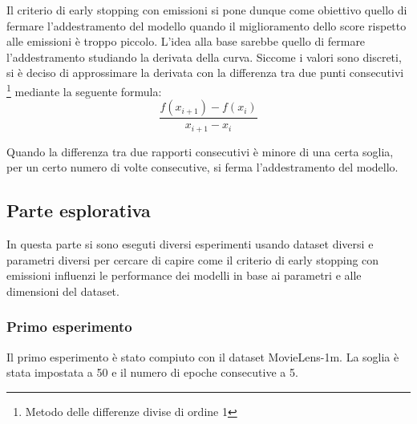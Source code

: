 \noindent Il criterio di early stopping con emissioni si pone dunque come obiettivo quello di fermare l'addestramento del modello quando il miglioramento dello score rispetto alle emissioni è troppo piccolo.
L'idea alla base sarebbe quello di fermare l'addestramento studiando la derivata della curva. Siccome i valori sono discreti, si è deciso di approssimare la derivata con la differenza tra due punti consecutivi \footnote{Metodo delle differenze divise di ordine 1}{} mediante la seguente formula:
\begin{equation}
    \frac{f(x_{i+1}) - f(x_i)}{x_{i+1} - x_i}
\end{equation}

\noindent Quando la differenza tra due rapporti consecutivi è minore di una certa soglia, per un certo numero di volte consecutive, si ferma l'addestramento del modello.

\subsection{Parte esplorativa}

In questa parte si sono eseguti diversi esperimenti usando dataset diversi e parametri diversi per cercare di capire come il criterio di early stopping con emissioni influenzi le performance dei modelli in base ai parametri e alle dimensioni del dataset.
\subsubsection{Primo esperimento}

Il primo esperimento è stato compiuto con il dataset MovieLens-1m. La soglia è stata impostata a 50 e il numero di epoche consecutive a 5.

